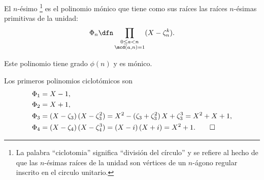 \begin{definicion}
  El $n$-ésimo
  \footnote{La palabra
    ``ciclotomia'' significa ``división del círculo'' y se refiere al hecho de
    que las $n$-ésimas raíces de la unidad son vértices de un $n$-ágono regular
    inscrito en el circulo unitario.} es el polinomio mónico que tiene como sus
  raíces las raíces $n$-ésimas primitivas de la
  unidad:
  $$\Phi_n \dfn \prod_{\substack{0 \le a < n \\ \mcd (a,n) = 1}} (X - \zeta_n^k).$$
\end{definicion}

Este polinomio tiene grado $\phi (n)$ y es mónico.

\begin{ejemplo}
  Los primeros polinomios ciclotómicos son
  \begin{align*}
    \Phi_1 & = X - 1,\\
    \Phi_2 & = X + 1,\\
    \Phi_3 & = (X - \zeta_3)\,(X - \zeta_3^2) = X^2 - (\zeta_3 + \zeta_3^2)\,X + \zeta_3^3 = X^2 + X + 1,\\
    \Phi_4 & = (X - \zeta_4)\,(X - \zeta_4^3) = (X - i)\,(X + i) = X^2 + 1. \qedhere
  \end{align*}
\end{ejemplo}


